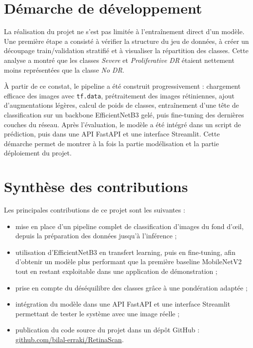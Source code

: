 \documentclass[12pt,a4paper]{report}
\begin{document}
\section{Démarche de développement}
La réalisation du projet ne s'est pas limitée à l'entraînement direct d'un modèle. Une première étape a consisté à vérifier la structure du jeu de données, à créer un découpage train/validation stratifié et à visualiser la répartition des classes. Cette analyse a montré que les classes \textit{Severe} et \textit{Proliferative DR} étaient nettement moins représentées que la classe \textit{No DR}.

À partir de ce constat, le pipeline a été construit progressivement : chargement efficace des images avec \texttt{tf.data}, prétraitement des images rétiniennes, ajout d'augmentations légères, calcul de poids de classes, entraînement d'une tête de classification sur un backbone EfficientNetB3 gelé, puis fine-tuning des dernières couches du réseau. Après l'évaluation, le modèle a été intégré dans un script de prédiction, puis dans une API FastAPI et une interface Streamlit. Cette démarche permet de montrer à la fois la partie modélisation et la partie déploiement du projet.

\section{Synthèse des contributions}
Les principales contributions de ce projet sont les suivantes :
\begin{itemize}
    \item mise en place d'un pipeline complet de classification d'images du fond d'œil, depuis la préparation des données jusqu'à l'inférence ;
    \item utilisation d'EfficientNetB3 en transfert learning, puis en fine-tuning, afin d'obtenir un modèle plus performant que la première baseline MobileNetV2 tout en restant exploitable dans une application de démonstration ;
    \item prise en compte du déséquilibre des classes grâce à une pondération adaptée ;
    \item intégration du modèle dans une API FastAPI et une interface Streamlit permettant de tester le système avec une image réelle ;
    \item publication du code source du projet dans un dépôt GitHub : \href{https://github.com/bilal-erraki/RetinaScan}{github.com/bilal-erraki/RetinaScan}.
\end{itemize}
\end{document}
